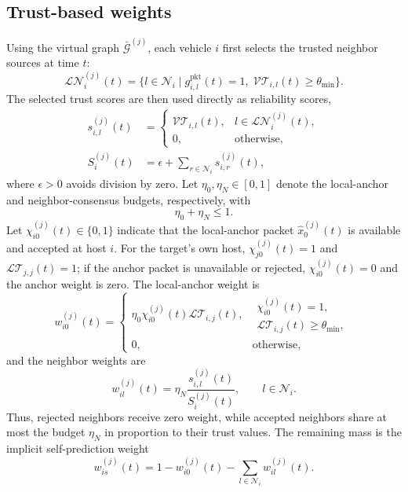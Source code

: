 \documentclass[letterpaper,journal]{IEEEtran}
\def\G{\mathcal{G}} %
\def\N{\mathcal{N}} %
\def\LT{\mathcal{LT}} %
\def\VT{\mathcal{VT}} %
\begin{document}
\subsection{Trust-based weights}
Using the virtual graph $\bar{\G}^{(j)}$, each vehicle $i$ first selects the trusted neighbor sources at time $t$:
\begin{equation}
\mathcal{LN}^{(j)}_{i}(t)
= \Big\{l\in\N_i\mid g_{i,l}^{\mathrm{pkt}}(t)=1,\;
\VT_{i,l}(t)\ge\theta_{\min}\Big\}.
\end{equation}
The selected trust scores are then used directly as reliability scores,
\begin{align}
s_{i,l}^{(j)}(t)
&=
\begin{cases}
\VT_{i,l}(t), & l\in\mathcal{LN}^{(j)}_{i}(t),\\
0, & \text{otherwise},
\end{cases}
\label{new_setneibor}\\
S_i^{(j)}(t)
&=\epsilon+\sum_{r\in\N_i}s_{i,r}^{(j)}(t),
\end{align}
where $\epsilon>0$ avoids division by zero. Let $\eta_0,\eta_N\in[0,1]$ denote the local-anchor and neighbor-consensus budgets, respectively, with
\begin{equation}
    \eta_0+\eta_N\le1 .
\end{equation}
Let $\chi_{i0}^{(j)}(t)\in\{0,1\}$ indicate that the local-anchor packet $\hat{x}_0^{(j)}(t)$ is available and accepted at host $i$. For the target's own host, $\chi_{j0}^{(j)}(t)=1$ and $\LT_{j,j}(t)=1$; if the anchor packet is unavailable or rejected, $\chi_{i0}^{(j)}(t)=0$ and the anchor weight is zero. The local-anchor weight is
\begin{equation}\label{eq_anchor_weight}
w_{i0}^{(j)}(t)=
\begin{cases}
\eta_0\chi_{i0}^{(j)}(t)\LT_{i,j}(t), &
\substack{\chi_{i0}^{(j)}(t)=1,\\ \LT_{i,j}(t)\ge\theta_{\min},}\\
0, & \text{otherwise},
\end{cases}
\end{equation}
and the neighbor weights are
\begin{equation}\label{design_gain}
    w_{il}^{(j)}(t)
    =
    \eta_N
    \frac{s_{i,l}^{(j)}(t)}
    {S_i^{(j)}(t)},
    \qquad l\in\N_i .
\end{equation}
Thus, rejected neighbors receive zero weight, while accepted neighbors share at most the budget $\eta_N$ in proportion to their trust values. The remaining mass is the implicit self-prediction weight
\begin{equation}
    w_{is}^{(j)}(t)
    =
    1-w_{i0}^{(j)}(t)-\sum_{l\in\N_i}w_{il}^{(j)}(t).
\end{equation}
\end{document}
